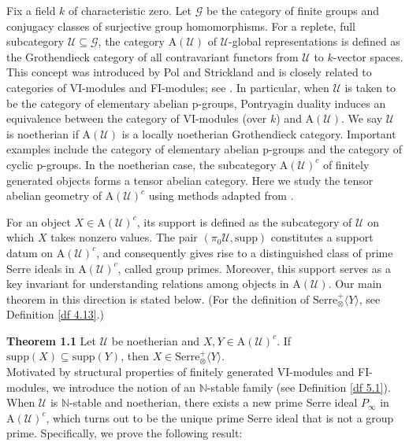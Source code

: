 \documentclass[11pt,a4paper]{amsart}
\numberwithin{equation}{section} \theoremstyle{plain}
\begin{document}
Fix a field $k$ of characteristic zero. Let $\mathcal{G}$  be the category of finite groups and conjugacy classes of surjective group homomorphisms. For  a replete, full subcategory $\mathcal{U}\subseteq \mathcal{G}$, the category $\mathrm{A}(\mathcal{U})$ of $\mathcal{U}$-global representations is defined as the Grothendieck category of all contravariant functors from $\mathcal{U}$ to $k$-vector spaces. This concept was introduced by Pol and Strickland and is closely related to categories of VI-modules and FI-modules; see \cite{PS22}. In particular, when $\mathcal{U}$ is taken to be the category of elementary abelian p-groups, Pontryagin duality induces an equivalence between the category of VI-modules (over $k$) and $\mathrm{A}(\mathcal{U})$.  We say $\mathcal{U}$ is  noetherian if $\mathrm{A}(\mathcal{U})$ is a locally noetherian Grothendieck category. Important examples include the category of elementary abelian p-groups and the category of cyclic p-groups. In the noetherian case,  the subcategory $\mathrm{A}(\mathcal{U})^{c}$ of finitely generated objects forms a tensor abelian category. Here we study the tensor abelian geometry of $\mathrm{A}(\mathcal{U})^{c}$  using methods adapted from \cite{BBP+25b}.

For an object $X\in \mathrm{A}(\mathcal{U})^{c}$, its support is defined as the subcategory of $\mathcal{U}$ on which $X$ takes nonzero values. The pair $(\pi_{0}\mathcal{U}, \mathrm{supp})$ constitutes a support datum on $\mathrm{A}(\mathcal{U})^{c}$, and consequently gives rise to a distinguished class of   prime Serre ideals in $\mathrm{A}(\mathcal{U})^{c}$, called group primes. Moreover, this support serves as a key invariant for understanding  relations among objects in $\mathrm{A}(\mathcal{U})$. Our main theorem in this direction is stated below. (For the definition of $\mathrm{Serre}_{\otimes}^{+}\langle Y\rangle$, see Definition \ref{df 4.13}.)

\vspace{2mm}
 {\bf Theorem 1.1 }  Let $\mathcal{U}$ be noetherian and $X, Y\in \mathrm{A}(\mathcal{U})^{c}$. If $\mathrm{supp}(X)\subseteq \mathrm{supp}(Y)$, then $X\in \mathrm{Serre}_{\otimes}^{+}\langle Y\rangle$.\\

Motivated by structural  properties of finitely generated VI-modules and FI-modules, we introduce the notion of an $\mathbb{N}$-stable family (see Definition \ref{df 5.1}). When $\mathcal{U}$ is $\mathbb{N}$-stable and noetherian, there exists a new prime Serre ideal $P_{\infty}$ in $\mathrm{A}(\mathcal{U})^{c}$, which turns out to be the unique prime Serre ideal that is not a group prime. Specifically, we prove the following result:
\end{document}
